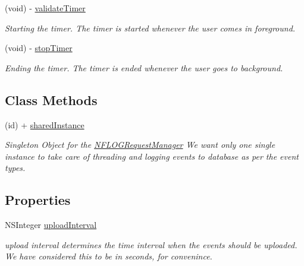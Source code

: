 \begin{DoxyCompactItemize}
\mbox{\label{interface_n_f_l_o_g_request_manager_adbb6382b702a49840494e7ea6f5d724a}} 
(void) -\/ \hyperlink{interface_n_f_l_o_g_request_manager_adbb6382b702a49840494e7ea6f5d724a}{validate\+Timer}
\begin{DoxyCompactList}\small\item\em Starting the timer. The timer is started whenever the user comes in foreground. \end{DoxyCompactList}\item 
\mbox{\label{interface_n_f_l_o_g_request_manager_a2a140a361a5b85f7c1ff51f4a60bbab3}} 
(void) -\/ \hyperlink{interface_n_f_l_o_g_request_manager_a2a140a361a5b85f7c1ff51f4a60bbab3}{stop\+Timer}
\begin{DoxyCompactList}\small\item\em Ending the timer. The timer is ended whenever the user goes to background. \end{DoxyCompactList}\end{DoxyCompactItemize}
\subsection*{Class Methods}
\begin{DoxyCompactItemize}
\item 
\mbox{\label{interface_n_f_l_o_g_request_manager_a345364dbcef1eeb7af13c1bfe117580e}} 
(id) + \hyperlink{interface_n_f_l_o_g_request_manager_a345364dbcef1eeb7af13c1bfe117580e}{shared\+Instance}
\begin{DoxyCompactList}\small\item\em Singleton Object for the \hyperlink{interface_n_f_l_o_g_request_manager}{N\+F\+L\+O\+G\+Request\+Manager} We want only one single instance to take care of threading and logging events to database as per the event types. \end{DoxyCompactList}\end{DoxyCompactItemize}
\subsection*{Properties}
\begin{DoxyCompactItemize}
\item 
\mbox{\label{interface_n_f_l_o_g_request_manager_afa6110f250aa2488b759db1cd0cc3d10}} 
N\+S\+Integer \hyperlink{interface_n_f_l_o_g_request_manager_afa6110f250aa2488b759db1cd0cc3d10}{upload\+Interval}
\begin{DoxyCompactList}\small\item\em upload interval determines the time interval when the events should be uploaded. We have considered this to be in seconds, for convenince. \end{DoxyCompactList}\end{DoxyCompactItemize}


